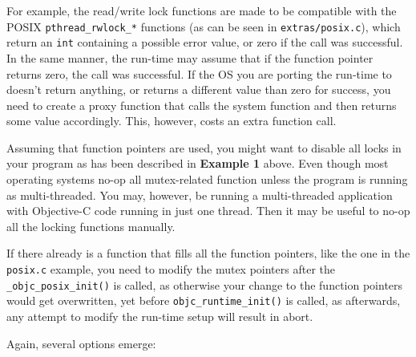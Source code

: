 \begin{itemize}
For example, the read/write lock functions are made to be compatible with the POSIX \verb=pthread_rwlock_*= functions (as can be seen in \verb=extras/posix.c=), which return an \verb=int= containing a possible error value, or zero if the call was successful. In the same manner, the run-time may assume that if the function pointer returns zero, the call was successful. If the OS you are porting the run-time to doesn't return anything, or returns a different value than zero for success, you need to create a proxy function that calls the system function and then returns some value accordingly. This, however, costs an extra function call.

\end{itemize}

Assuming that function pointers are used, you might want to disable all locks in your program as has been described in \textbf{Example 1} above. Even though most operating systems no-op all mutex-related function unless the program is running as multi-threaded. You may, however, be running a multi-threaded application with Objective-C code running in just one thread. Then it may be useful to no-op all the locking functions manually.

If there already is a function that fills all the function pointers, like the one in the \verb=posix.c= example, you need to modify the mutex pointers after the \verb=_objc_posix_init()= is called, as otherwise your change to the function pointers would get overwritten, yet before \verb=objc_runtime_init()= is called, as afterwards, any attempt to modify the run-time setup will result in abort.

Again, several options emerge:

